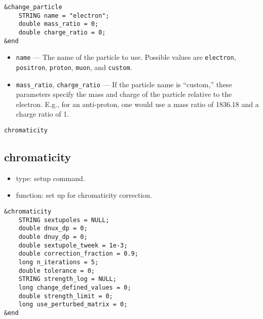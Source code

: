 \documentclass[11pt]{article}
\begin{document}
\begin{verbatim}
&change_particle
    STRING name = "electron";
    double mass_ratio = 0;
    double charge_ratio = 0;
&end
\end{verbatim}

\begin{itemize}
\item \verb|name| --- The name of the particle to use.  Possible values are \verb|electron|, \verb|positron|,
  \verb|proton|, \verb|muon|, and \verb|custom|.
\item \verb|mass_ratio|, \verb|charge_ratio| --- If the particle name is ``custom,'' these parameters specify the
  mass and charge of the particle relative to the electron.  E.g., for an anti-proton, one would use
  a mass ratio of 1836.18 and a charge ratio of 1.
\end{itemize}

\begin{latexonly}
\newpage
\begin{center}{\Large\verb|chromaticity|}\end{center}
\end{latexonly}
\subsection{chromaticity \label{subsec:chromaticity}}

\begin{itemize}
\item type: setup command.
\item function: set up for chromaticity correction.
\end{itemize}

\begin{verbatim}
&chromaticity
    STRING sextupoles = NULL;
    double dnux_dp = 0;
    double dnuy_dp = 0;
    double sextupole_tweek = 1e-3;
    double correction_fraction = 0.9;
    long n_iterations = 5;
    double tolerance = 0;
    STRING strength_log = NULL;
    long change_defined_values = 0;
    double strength_limit = 0;
    long use_perturbed_matrix = 0;    
&end
\end{verbatim}
\end{document}
